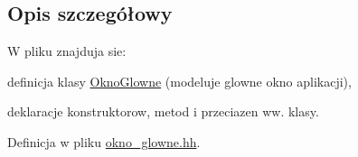 \subsection{Opis szczegółowy}
W pliku znajduja sie\-:
\begin{DoxyItemize}
\item definicja klasy \hyperlink{class_okno_glowne}{Okno\-Glowne} (modeluje glowne okno aplikacji),
\item deklaracje konstruktorow, metod i przeciazen ww. klasy. 
\end{DoxyItemize}

Definicja w pliku \hyperlink{okno__glowne_8hh_source}{okno\-\_\-glowne.\-hh}.

